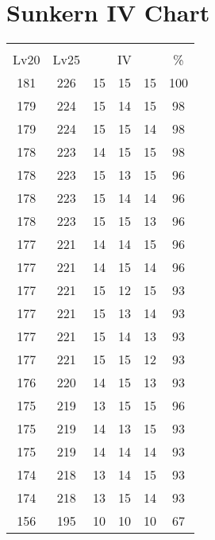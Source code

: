\documentclass{article}%
\begin{document}
%
\normalsize%
\section{Sunkern IV Chart}%
\label{sec:Sunkern IV Chart}%
\renewcommand{\arraystretch}{1.5}%
\begin{tabular}{|c|c|c|c|c|c|}%
\hline%
\multicolumn{6}{|c|}{\textcolor{white}{ 
\linebreak{Sunkern}
}%
\cellcolor{black}}\\%
\multicolumn{1}{|c}{Lv20}&\multicolumn{1}{c|}{Lv25}&\multicolumn{3}{c|}{IV}&\multicolumn{1}{|c|}{\%}\\%
\hline%
\rowcolor{color100}%
181&226&15&15&15&100\\%
\hline%
\rowcolor{color98}%
179&224&15&14&15&98\\%
\hline%
\rowcolor{color98}%
179&224&15&15&14&98\\%
\hline%
\rowcolor{color98}%
178&223&14&15&15&98\\%
\hline%
\rowcolor{color96}%
178&223&15&13&15&96\\%
\hline%
\rowcolor{color96}%
178&223&15&14&14&96\\%
\hline%
\rowcolor{color96}%
178&223&15&15&13&96\\%
\hline%
\rowcolor{color96}%
177&221&14&14&15&96\\%
\hline%
\rowcolor{color96}%
177&221&14&15&14&96\\%
\hline%
\rowcolor{color93}%
177&221&15&12&15&93\\%
\hline%
\rowcolor{color93}%
177&221&15&13&14&93\\%
\hline%
\rowcolor{color93}%
177&221&15&14&13&93\\%
\hline%
\rowcolor{color93}%
177&221&15&15&12&93\\%
\hline%
\rowcolor{color93}%
176&220&14&15&13&93\\%
\hline%
\rowcolor{color96}%
175&219&13&15&15&96\\%
\hline%
\rowcolor{color93}%
175&219&14&13&15&93\\%
\hline%
\rowcolor{color93}%
175&219&14&14&14&93\\%
\hline%
\rowcolor{color93}%
174&218&13&14&15&93\\%
\hline%
\rowcolor{color93}%
174&218&13&15&14&93\\%
\hline%
\rowcolor{color91}%
156&195&10&10&10&67\\%
\end{tabular}

%
\end{document}
